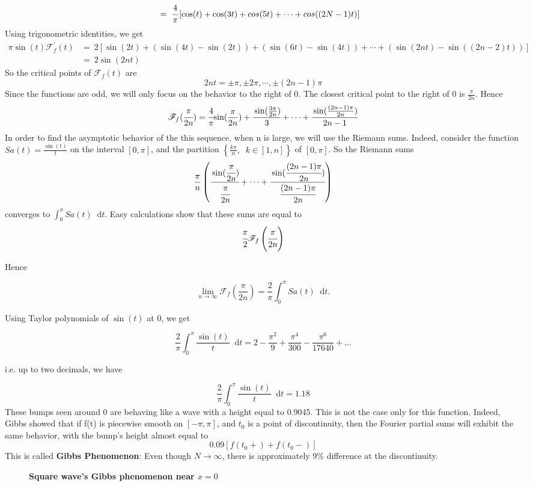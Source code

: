 \documentclass[margin,line]{res}
\newcommand*{\dif}{\mathop{}\!\mathrm{d}}
\begin{document}
\begin{resume}
\begin{align}
	&= \ \cfrac{4}{\pi} \left[ \cos(t) + \cos(3t) + cos(5t) + \cdots + cos((2N-1)t) \right] \nonumber 
\end{align}
Using trigonometric identities, we get 
\begin{align}
\pi\sin(t) \mathscr{F}^{'}_f(t) 
	&= \ 2\left[ \sin(2t) + (\sin(4t)-\sin(2t)) + (\sin(6t)-\sin(4t)) + \cdots + (\sin(2nt)-\sin((2n-2)t))\right] \nonumber \\
	&= \ 2\sin(2nt) \nonumber
\end{align}
So the critical points of $\mathscr{F}_f(t)$ are 
$$
2nt = \pm\pi , \pm 2\pi,\cdots,\pm (2n-1)\pi
$$
Since the functions are odd, we will only focus on the behavior to the right of 0. The closest critical point to the right of 0 is $\frac{\pi}{2n}$. Hence 
$$
\mathscr{F}_f(\cfrac{\pi}{2n}) = \cfrac{4}{\pi} {
	\sin(\frac{\pi}{2n}) + \cfrac{\sin(\frac{3\pi}{2n})}{3} + \cdots +
	\cfrac{\sin(\frac{(2n-1)\pi}{2n})}{2n-1}
}
$$
In order to find the asymptotic behavior of the this sequence, when n is large, we will use the Riemann sums. Indeed, consider the function $Sa(t) = \frac{\sin(t)}{t}$ on the interval $[0,\pi]$, and the partition $\left\{{\frac{k\pi}{n}}, \;\;k \in [1,n]\right\}$ of $[0,\pi]$. So the Riemann sums
$$
\frac{\pi}{n}
\left(
	\cfrac{\sin(\cfrac{\pi}{2n})}{\cfrac{\pi}{2n}} + \cdots +
	\cfrac{\sin(\cfrac{(2n-1)\pi}{2n})}{\cfrac{(2n-1)\pi}{2n}}
\right)
$$
converges to $\int_{0}^{\pi} Sa(t) \dif t$. Easy calculations show that these sums are equal to 
$$
\cfrac{\pi}{2}{\mathscr{F}_f \left( \cfrac{\pi}{2n} \right) }
$$

Hence

$$
\lim_{n \rightarrow \infty} \mathscr{F}_f \left(\frac{\pi}{2n}\right) = \frac{2}{\pi}\int_{0}^{\pi}Sa(t) \dif t.
$$

Using Taylor polynomials of $\sin(t)$ at 0, we get

$$
\frac{2}{\pi}\int_{0}^{\pi}\frac{\sin(t)}{t} \dif t = 2 - \frac{\pi^2}{9} + \frac{\pi^4}{300} - \frac{\pi^6}{17640}+\ldots
$$

i.e. up to two decimals, we have

$$
\frac{2}{\pi}\int_{0}^{\pi}\frac{\sin(t)}{t} \dif t = 1.18
$$
These bumps seen around 0 are behaving like a wave with a height equal to 0.9045. This is not the case only for this function. Indeed, Gibbs showed that if f(t) is piecewise smooth on $[-\pi,\pi]$, and $t_0$ is a point of discontinuity, then the Fourier partial sums will exhibit the same behavior, with the bump's height almost equal to 
$$
0.09\left[ f(t_0+) + f(t_0-)\right]
$$
This is called \textbf{Gibbs Phenomenon}: Even though $N \rightarrow \infty$, there is approximately $9\%$ difference at the discontinuity.
\begin{figure}[H]
	\centerline{\textbf{Square wave's Gibbs phenomenon near $x=0$}}
	\centerline{}
\end{figure}
\clearpage


\end{resume}
\end{document}
